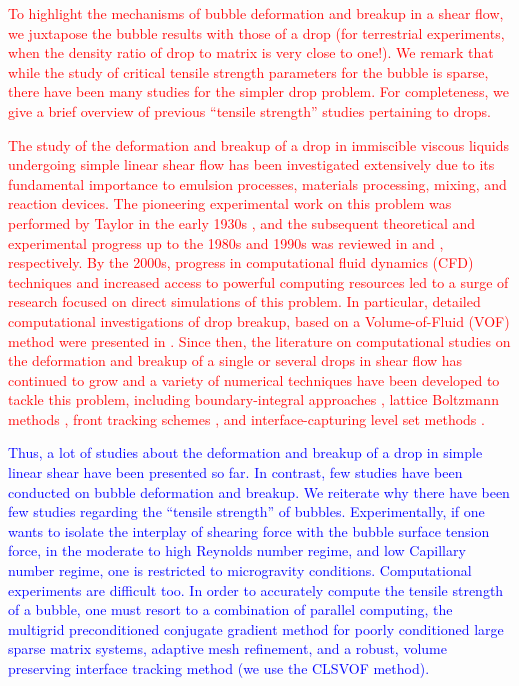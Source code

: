 \documentclass{elsarticle}
\begin{document}
\par
\textcolor{red} {
To highlight the mechanisms of bubble deformation and breakup in a shear flow, we juxtapose the bubble results with those of a drop (for terrestrial experiments, when the density ratio of drop to matrix is very close to one!).  We remark that while the study of critical tensile strength parameters for the bubble is sparse, there have been many studies for the simpler drop problem. For completeness, we give a brief overview of previous ``tensile strength'' studies pertaining to drops.
}
\par
\textcolor{red} {
The study of the deformation and breakup of a drop in immiscible viscous liquids undergoing simple linear shear flow has been investigated extensively due to its fundamental importance to emulsion processes, materials processing, mixing, and reaction devices.  The pioneering experimental work on this problem was performed by Taylor in the early 1930s \cite{Tay32, Tay34}, and the subsequent theoretical and experimental progress up to the 1980s and 1990s was reviewed in \cite{Ral84} and \cite{Sto94}, respectively.  By the 2000s, progress in computational fluid dynamics (CFD) techniques and increased access to powerful computing resources led to a surge of research focused on direct simulations of this problem.  In particular, detailed computational investigations of drop breakup, based on a Volume-of-Fluid (VOF) method \cite{HirNic81} were presented in \cite{LiRenRen00, RenCri01-1, RenCri01-2, RenCriLi02,KhiRenCri03,Ren06,Ren07,Ren08-2}.  Since then, the literature on computational studies on the deformation and breakup of a single or several drops in shear flow has continued to grow \cite{CriGuiAlfBlaLoe03, InaTomOgi03,ZhaMikBan06, BazAndMei06, JanAnd08, CroGriSch10,KomShaEskDer14,KomShaEskDer15, IoaLiuZha16, HerRan17,AmaBalCasOli19, ZhaShuGuaYan21} and a variety of numerical techniques have been developed to tackle this problem, including boundary-integral approaches \cite{CriBlaLoe01, JanAnd07}, lattice Boltzmann methods \cite{Ina06, KomShaEskDer14}, front tracking schemes \cite{UnvTry92}, and interface-capturing level set methods \cite{SusSmeOsh94}.
}
\par
\textcolor{blue} 
{ Thus, a lot of studies about the deformation and breakup of a drop in simple linear shear have been presented so far. In contrast, few studies have been conducted on bubble deformation and breakup.  We reiterate why there have been few studies regarding the ``tensile strength'' of bubbles. Experimentally, if one wants to isolate the interplay of shearing force with the bubble surface tension force, in the moderate to high Reynolds number regime, and low Capillary number regime, one is restricted to microgravity conditions.  Computational experiments are difficult too. In order to accurately compute the tensile strength of a bubble, one must resort to a combination of parallel computing, the multigrid preconditioned conjugate gradient method\cite{tatebe1993multigrid,SusSmiHusOhtZhi07} for poorly conditioned large sparse matrix systems, adaptive mesh refinement\cite{AMReX_JOSS,SusSmiHusOhtZhi07}, and a robust, volume preserving interface tracking method (we use the CLSVOF method\cite{SusPuc00,SusSmiHusOhtZhi07}).
}
\end{document}
